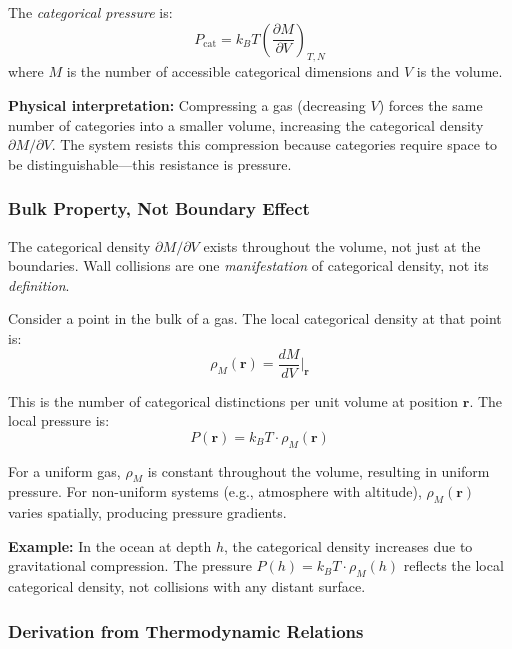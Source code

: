 \begin{definition}
The \textit{categorical pressure} is:
\begin{equation}
\boxed{P_{\text{cat}} = k_B T \left(\frac{\partial M}{\partial V}\right)_{T,N}}
\label{eq:categorical_pressure}
\end{equation}
where $M$ is the number of accessible categorical dimensions and $V$ is the volume.
\end{definition}

\textbf{Physical interpretation:} Compressing a gas (decreasing $V$) forces the same number of categories into a smaller volume, increasing the categorical density $\partial M/\partial V$. The system resists this compression because categories require space to be distinguishable—this resistance is pressure.

\subsubsection{Bulk Property, Not Boundary Effect}

The categorical density $\partial M/\partial V$ exists throughout the volume, not just at the boundaries. Wall collisions are one \textit{manifestation} of categorical density, not its \textit{definition}.

Consider a point in the bulk of a gas. The local categorical density at that point is:
\begin{equation}
\rho_M(\mathbf{r}) = \frac{dM}{dV}\bigg|_{\mathbf{r}}
\end{equation}

This is the number of categorical distinctions per unit volume at position $\mathbf{r}$. The local pressure is:
\begin{equation}
P(\mathbf{r}) = k_B T \cdot \rho_M(\mathbf{r})
\end{equation}

For a uniform gas, $\rho_M$ is constant throughout the volume, resulting in uniform pressure. For non-uniform systems (e.g., atmosphere with altitude), $\rho_M(\mathbf{r})$ varies spatially, producing pressure gradients.

\textbf{Example:} In the ocean at depth $h$, the categorical density increases due to gravitational compression. The pressure $P(h) = k_B T \cdot \rho_M(h)$ reflects the local categorical density, not collisions with any distant surface.

\subsubsection{Derivation from Thermodynamic Relations}

